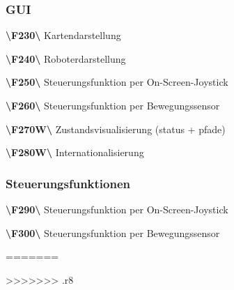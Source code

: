 \documentclass[10pt,a4paper]{article}
\begin{document}
			\subsubsection{GUI}
				\begin{list}{}{\leftmargin=1cm}
					\item[\textbf{\textbackslash F230\textbackslash}] Kartendarstellung
					\item[\textbf{\textbackslash F240\textbackslash}] Roboterdarstellung				
					\item[\textbf{\textbackslash F250\textbackslash}] Steuerungsfunktion per On-Screen-Joystick
					\item[\textbf{\textbackslash F260\textbackslash}] Steuerungsfunktion per Bewegungssensor					
					\item[\textbf{\textbackslash F270W\textbackslash}] Zustandsvisualisierung (status + pfade)		
					\item[\textbf{\textbackslash F280W\textbackslash}] Internationalisierung	
				\end{list}		
			\subsubsection{Steuerungsfunktionen}		
				\begin{list}{}{\leftmargin=1cm}
					\item[\textbf{\textbackslash F290\textbackslash}] Steuerungsfunktion per On-Screen-Joystick
					\item[\textbf{\textbackslash F300\textbackslash}] Steuerungsfunktion per Bewegungssensor					
				\end{list}				
=======
			
			
>>>>>>> .r8
\end{document}
